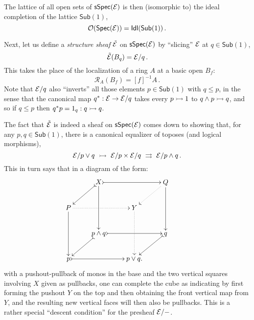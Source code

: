 \documentclass[lambek.tex]{subfiles}
\begin{document}
The lattice of all open sets of $\mathsf{sSpec}(\mathcal{E})$ is then (isomorphic to) the ideal completion of the lattice $\mathsf{Sub}(1)$,
$$\mathcal{O}(\mathsf{Spec}(\mathcal{E})) = \mathsf{Idl}(\mathsf{Sub}(1))\,.$$

%



Next, let us define a \emph{structure sheaf} $\tilde{\mathcal{E}}$ on $\mathsf{sSpec}(\mathcal{E})$ by ``slicing'' $\mathcal{E}$ at $q \in\mathsf{Sub}(1)$,
\[
\tilde{\mathcal{E}}(B_q) = \mathcal{E}/q\,.
\]
This takes the place of the localization of a ring $A$ at a basic open $B_f$:
\[
\mathcal{R}_A(B_f) = [f]^{-1}A\,.
\]
Note that $\mathcal{E}/q$ also ``inverts'' all those elements $p\in \mathsf{Sub}(1)$ with $q\leq p$, in the sense that the canonical map 
$q^* : \mathcal{E} \to \mathcal{E}/q$ takes every $p \rightarrowtail 1$ to $q\wedge p \rightarrowtail q$, and so if $q\leq p$ then $q^*p = 1_q : q \rightarrowtail q$.

The fact that $\tilde{\mathcal{E}}$ is indeed a sheaf on $\mathsf{sSpec}(\mathcal{E})$ comes down to showing that, for any $p, q \in \mathsf{Sub}(1)$, there is a canonical equalizer of toposes (and logical morphisms),
\[
\E/p\vee q\ \mono\ \E/p \times \E/q\ \rightrightarrows\ \E/p\wedge q \,.
\]
This in turn says that in a diagram of the form: 
 \[ 
 \xymatrix{ 
& X \ar@{>->}[ld] \ar[dd] \ar@{>->}[rr] && Q \ar@{.>}[ld] \ar[dd] & \\
 P \ar[dd] \ar@{.>}[rr] && Y \ar@{.>}[dd]\\ 
 & p \wedge q \ar@{>->}[ld] \ar@{>->}[rr] && q \ar@{>->}[ld] & \\
  p \ar@{>->}[rr] && p\vee q .} 
 \] 
 with a pushout-pullback of monos in the base and the two vertical squares involving $X$ given as pullbacks, one can complete the cube as indicating by first forming the pushout $Y$ on the top and then obtaining the front vertical map from $Y$, and the resulting new vertical faces will then also be pullbacks. This is a rather special ``descent condition'' for the presheaf $\mathcal{E}/-$.
 
\end{document}
